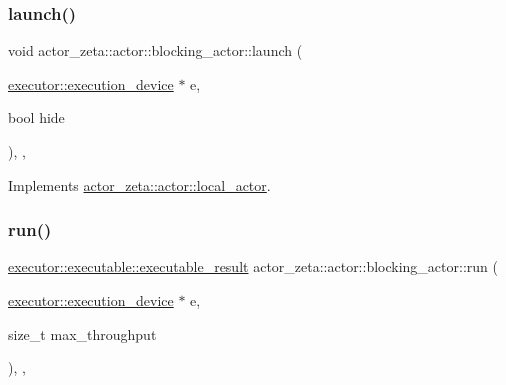 \mbox{\label{classactor__zeta_1_1actor_1_1blocking__actor_a7988829bb7d264b3f226f8c5d4156cb1}} 
\subsubsection{\texorpdfstring{launch()}{launch()}}
{\footnotesize\ttfamily void actor\+\_\+zeta\+::actor\+::blocking\+\_\+actor\+::launch (\begin{DoxyParamCaption}\item[{\hyperlink{structactor__zeta_1_1executor_1_1execution__device}{executor\+::execution\+\_\+device} $\ast$}]{e,  }\item[{bool}]{hide }\end{DoxyParamCaption})\hspace{0.3cm}{\ttfamily [final]}, {\ttfamily [override]}, {\ttfamily [virtual]}}



Implements \hyperlink{classactor__zeta_1_1actor_1_1local__actor_acfba412b813aee3250c589bee232f3cd}{actor\+\_\+zeta\+::actor\+::local\+\_\+actor}.

\mbox{\label{classactor__zeta_1_1actor_1_1blocking__actor_af92ae4139344b002f8014433f64f8e56}} 
\subsubsection{\texorpdfstring{run()}{run()}}
{\footnotesize\ttfamily \hyperlink{structactor__zeta_1_1executor_1_1executable_aef06c63be7b22b021ade4b83ed4f3cc4}{executor\+::executable\+::executable\+\_\+result} actor\+\_\+zeta\+::actor\+::blocking\+\_\+actor\+::run (\begin{DoxyParamCaption}\item[{\hyperlink{structactor__zeta_1_1executor_1_1execution__device}{executor\+::execution\+\_\+device} $\ast$}]{e,  }\item[{size\+\_\+t}]{max\+\_\+throughput }\end{DoxyParamCaption})\hspace{0.3cm}{\ttfamily [final]}, {\ttfamily [override]}, {\ttfamily [virtual]}}



